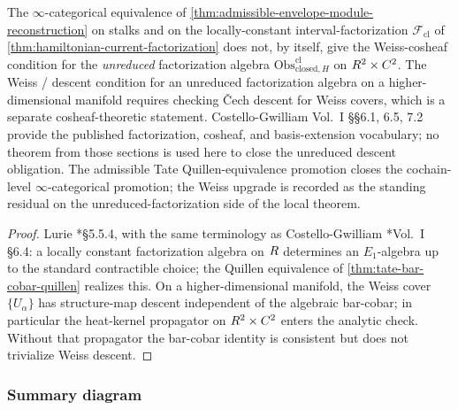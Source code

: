 \begin{prop}
  \label{prop:weiss-cosheaf-residual}
  The $\infty$-categorical equivalence of
  \ref{thm:admissible-envelope-module-reconstruction} on stalks and on
  the locally-constant interval-factorization $\mathcal F_{\mathrm{cl}}$
  of \ref{thm:hamiltonian-current-factorization} does not,
  by itself, give the Weiss-cosheaf condition for the
  \emph{unreduced} factorization algebra
  $\mathrm{Obs}^{\mathrm{cl}}_{\mathrm{closed},H}$ on $R^2\times C^2$.
  The Weiss / descent condition for an unreduced factorization
  algebra on a higher-dimensional manifold requires checking
  \v{C}ech descent for Weiss covers, which is a separate
  cosheaf-theoretic statement.  Costello-Gwilliam Vol.~I
  \S\S 6.1, 6.5, 7.2 provide the published factorization,
  cosheaf, and basis-extension vocabulary; no theorem from those
  sections is used here to close the unreduced descent obligation.  The
  admissible Tate Quillen-equivalence promotion closes the cochain-level
  $\infty$-categorical promotion; the Weiss upgrade is recorded as the standing residual on the
  unreduced-factorization side of the local theorem.
\end{prop}

\begin{proof}
  Lurie \cite{lurie-ha}*{\S 5.5.4}, with the same terminology as
  Costello-Gwilliam \cite{costello-gwilliam}*{Vol.~I \S 6.4}: a locally constant factorization
  algebra on $R$ determines an $E_1$-algebra up to the standard
  contractible choice; the
  Quillen equivalence of \ref{thm:tate-bar-cobar-quillen}
  realizes this. On a higher-dimensional manifold, the Weiss
  cover $\{U_\alpha\}$ has structure-map descent independent of
  the algebraic bar-cobar; in particular the heat-kernel
  propagator on $R^2\times C^2$ enters the analytic check.
  Without that propagator the bar-cobar identity is consistent
  but does not trivialize Weiss descent.
\end{proof}

\subsubsection{Summary diagram}

